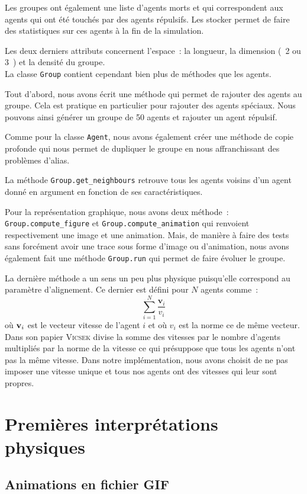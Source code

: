 \documentclass[french, a4paper, 12pt, openany]{report}
\begin{document}
	Les groupes ont également une liste d'agents morts et qui correspondent aux agents qui ont été touchés par des agents répulsifs. Les stocker permet de faire des statistiques sur ces agents à la fin de la simulation.
	
	Les deux derniers attributs concernent l'espace~: la longueur, la dimension (~2 ou 3~) et la densité du groupe. \\
	
	La classe \verb|Group| contient cependant bien plus de méthodes que les agents.
	
	Tout d'abord, nous avons écrit une méthode qui permet de rajouter des agents au groupe. Cela est pratique en particulier pour rajouter des agents spéciaux. Nous pouvons ainsi générer un groupe de 50 agents et rajouter un agent répulsif.
	
	Comme pour la classe \verb|Agent|, nous avons également créer une méthode de copie profonde qui nous permet de dupliquer le groupe en nous affranchissant des problèmes d'alias.
	
	La méthode \verb|Group.get_neighbours| retrouve tous les agents voisins d'un agent donné en argument en fonction de ses caractéristiques.
	
	Pour la représentation graphique, nous avons deux méthode~: \verb|Group.compute_figure| et \verb|Group.compute_animation| qui renvoient respectivement une image et une animation. Mais, de manière à faire des tests sans forcément avoir une trace sous forme d'image ou d'animation, nous avons également fait une méthode \verb|Group.run| qui permet de faire évoluer le groupe.
	
	La dernière méthode a un sens un peu plus physique puisqu'elle correspond au paramètre d'alignement. Ce dernier est défini pour $N$ agents comme~:
	\[
		\sum_{i=1}^N \frac{\textbf{v}_i}{v_i}
	\]
	\label{formule_align}
	où $\textbf v_i$ est le vecteur vitesse de l'agent $i$ et où $v_i$ est la norme ce de même vecteur. Dans son papier \textsc{Vicsek} divise la somme des vitesses par le nombre d'agents multipliés par la norme de la vitesse ce qui présuppose que tous les agents n'ont pas la même vitesse. Dans notre implémentation, nous avons choisit de ne pas imposer une vitesse unique et tous nos agents ont des vitesses qui leur sont propres.	

   
\chapter{Premières interprétations physiques}
\section{Animations en fichier GIF}
\end{document}
